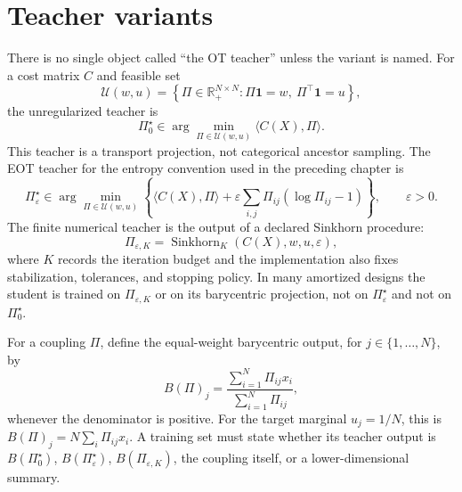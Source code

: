\section{Teacher variants}
\label{sec:bf-learned-ot-hierarchy}

There is no single object called ``the OT teacher'' unless the variant is named.
For a cost matrix $C$ and feasible set
\[
  \mathcal U(w,u)=
  \left\{\Pi\in\mathbb{R}_+^{N\times N}:
  \Pi\mathbf 1=w,\ \Pi^\top\mathbf 1=u\right\},
\]
the unregularized teacher is
\begin{equation}
\label{eq:bf-learned-ot-unregularized-teacher}
  \Pi_0^\star
  \in
  \arg\min_{\Pi\in\mathcal U(w,u)}
  \langle C(X), \Pi\rangle .
\end{equation}
This teacher is a transport projection, not categorical ancestor sampling.  The
EOT teacher for the entropy convention used in the preceding chapter is
\begin{equation}
\label{eq:bf-learned-ot-eot-teacher}
  \Pi_\varepsilon^\star
  \in
  \arg\min_{\Pi\in\mathcal U(w,u)}
  \left\{
    \langle C(X), \Pi\rangle
    + \varepsilon\sum_{i,j}\Pi_{ij}(\log \Pi_{ij}-1)
  \right\},
  \qquad \varepsilon>0 .
\end{equation}
The finite numerical teacher is the output of a declared Sinkhorn procedure:
\begin{equation}
\label{eq:bf-learned-ot-finite-teacher}
  \Pi_{\varepsilon,K}=\operatorname{Sinkhorn}_K(C(X),w,u,\varepsilon),
\end{equation}
where $K$ records the iteration budget and the implementation also fixes
stabilization, tolerances, and stopping policy.  In many amortized designs the
student is trained on $\Pi_{\varepsilon,K}$ or on its barycentric projection,
not on $\Pi_\varepsilon^\star$ and not on $\Pi_0^\star$.

For a coupling $\Pi$, define the equal-weight barycentric output, for
$j\in\{1,\ldots,N\}$, by
\begin{equation}
\label{eq:bf-learned-ot-barycentric-teacher}
  B(\Pi)_j
  =
  \frac{\sum_{i=1}^N \Pi_{ij} x_i}{\sum_{i=1}^N \Pi_{ij}},
\end{equation}
whenever the denominator is positive.  For the target marginal $u_j=1/N$, this
is $B(\Pi)_j=N\sum_i \Pi_{ij}x_i$.  A training set must state whether its
teacher output is $B(\Pi_0^\star)$, $B(\Pi_\varepsilon^\star)$,
$B(\Pi_{\varepsilon,K})$, the coupling itself, or a lower-dimensional summary.

